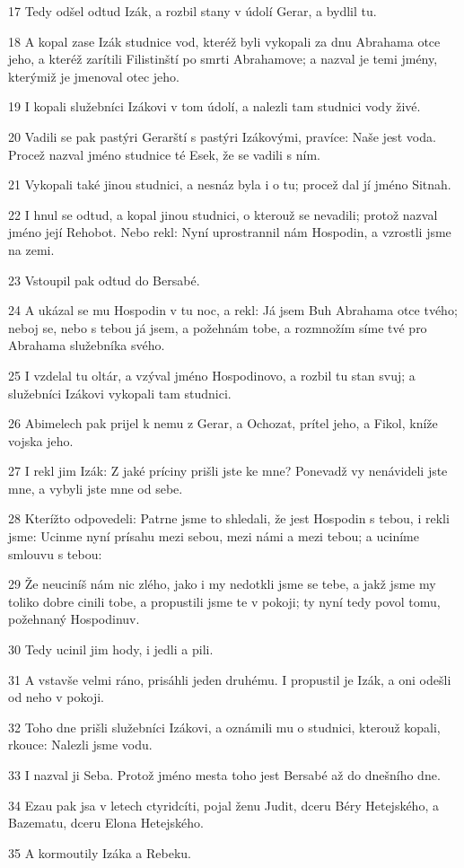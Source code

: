 \par 17 Tedy odšel odtud Izák, a rozbil stany v údolí Gerar, a bydlil tu.
\par 18 A kopal zase Izák studnice vod, kteréž byli vykopali za dnu Abrahama otce jeho, a kteréž zarítili Filistinští po smrti Abrahamove; a nazval je temi jmény, kterýmiž je jmenoval otec jeho.
\par 19 I kopali služebníci Izákovi v tom údolí, a nalezli tam studnici vody živé.
\par 20 Vadili se pak pastýri Gerarští s pastýri Izákovými, pravíce: Naše jest voda. Procež nazval jméno studnice té Esek, že se vadili s ním.
\par 21 Vykopali také jinou studnici, a nesnáz byla i o tu; procež dal jí jméno Sitnah.
\par 22 I hnul se odtud, a kopal jinou studnici, o kterouž se nevadili; protož nazval jméno její Rehobot. Nebo rekl: Nyní uprostrannil nám Hospodin, a vzrostli jsme na zemi.
\par 23 Vstoupil pak odtud do Bersabé.
\par 24 A ukázal se mu Hospodin v tu noc, a rekl: Já jsem Buh Abrahama otce tvého; neboj se, nebo s tebou já jsem, a požehnám tobe, a rozmnožím síme tvé pro Abrahama služebníka svého.
\par 25 I vzdelal tu oltár, a vzýval jméno Hospodinovo, a rozbil tu stan svuj; a služebníci Izákovi vykopali tam studnici.
\par 26 Abimelech pak prijel k nemu z Gerar, a Ochozat, prítel jeho, a Fikol, kníže vojska jeho.
\par 27 I rekl jim Izák: Z jaké príciny prišli jste ke mne? Ponevadž vy nenávideli jste mne, a vybyli jste mne od sebe.
\par 28 Kterížto odpovedeli: Patrne jsme to shledali, že jest Hospodin s tebou, i rekli jsme: Ucinme nyní prísahu mezi sebou, mezi námi a mezi tebou; a uciníme smlouvu s tebou:
\par 29 Že neuciníš nám nic zlého, jako i my nedotkli jsme se tebe, a jakž jsme my toliko dobre cinili tobe, a propustili jsme te v pokoji; ty nyní tedy povol tomu, požehnaný Hospodinuv.
\par 30 Tedy ucinil jim hody, i jedli a pili.
\par 31 A vstavše velmi ráno, prisáhli jeden druhému. I propustil je Izák, a oni odešli od neho v pokoji.
\par 32 Toho dne prišli služebníci Izákovi, a oznámili mu o studnici, kterouž kopali, rkouce: Nalezli jsme vodu.
\par 33 I nazval ji Seba. Protož jméno mesta toho jest Bersabé až do dnešního dne.
\par 34 Ezau pak jsa v letech ctyridcíti, pojal ženu Judit, dceru Béry Hetejského, a Bazematu, dceru Elona Hetejského.
\par 35 A kormoutily Izáka a Rebeku.


